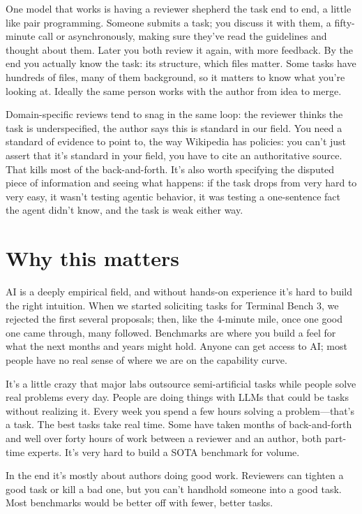 \documentclass[11pt]{article}
\begin{document}
One model that works is having a reviewer shepherd the task end to end, a little like pair programming. Someone submits a task; you discuss it with them, a fifty-minute call or asynchronously, making sure they've read the guidelines and thought about them. Later you both review it again, with more feedback. By the end you actually know the task: its structure, which files matter. Some tasks have hundreds of files, many of them background, so it matters to know what you're looking at. Ideally the same person works with the author from idea to merge.

Domain-specific reviews tend to snag in the same loop: the reviewer thinks the task is underspecified, the author says this is standard in our field. You need a standard of evidence to point to, the way Wikipedia has policies: you can't just assert that it's standard in your field, you have to cite an authoritative source. That kills most of the back-and-forth. It's also worth specifying the disputed piece of information and seeing what happens: if the task drops from very hard to very easy, it wasn't testing agentic behavior, it was testing a one-sentence fact the agent didn't know, and the task is weak either way.

\section{Why this matters}

AI is a deeply empirical field, and without hands-on experience it's hard to build the right intuition. When we started soliciting tasks for Terminal Bench 3, we rejected the first several proposals; then, like the 4-minute mile, once one good one came through, many followed. Benchmarks are where you build a feel for what the next months and years might hold. Anyone can get access to AI; most people have no real sense of where we are on the capability curve.

It's a little crazy that major labs outsource semi-artificial tasks while people solve real problems every day. People are doing things with LLMs that could be tasks without realizing it. Every week you spend a few hours solving a problem—that's a task. The best tasks take real time. Some have taken months of back-and-forth and well over forty hours of work between a reviewer and an author, both part-time experts. It’s very hard to build a SOTA benchmark for volume.

In the end it's mostly about authors doing good work. Reviewers can tighten a good task or kill a bad one, but you can't handhold someone into a good task. Most benchmarks would be better off with fewer, better tasks.
\end{document}
